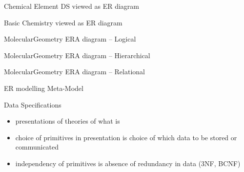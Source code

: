 \documentclass[xcolor=pst,dvips]{beamer}   %
\renewcommand{\erpictureFolder}[0]{../SharedPictures}
\begin{document}
\begin{frame}{Chemical Element DS viewed as ER diagram}
\begin{center}
\scalebox{0.85}{

}
\end{center}

\end{frame}

\begin{frame}{Basic Chemistry viewed as ER diagram}
\begin{center}
\scalebox{0.5}{

}
\end{center}
\end{frame}


\begin{frame}{MolecularGeometry ERA diagram  -- Logical }
\begin{center}
\scalebox{0.5}{

}
\end{center}
\end{frame}

\begin{frame}{MolecularGeometry ERA diagram -- Hierarchical}
\begin{center}
\scalebox{0.5}{

}
\end{center}
\end{frame}

\begin{frame}{MolecularGeometry  ERA diagram -- Relational}
\begin{center}
\scalebox{0.5}{

}
\end{center}
\end{frame}


\begin{frame}{ER modelling Meta-Model}
\scalebox{0.23}{

}
\end{frame}


\begin{frame}{Data Specifications}
\begin{itemize}
\item presentations of theories of what is
\item choice of primitives in presentation is choice of which data to be stored or communicated
\item independency of primitives is absence of redundancy in data (3NF, BCNF)
\end{itemize}
\end{frame}
\end{document}
